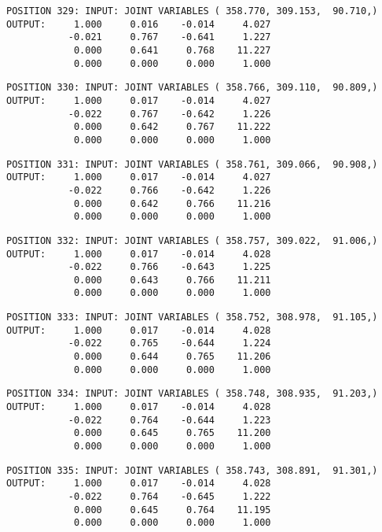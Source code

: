 \begin{verbatim}
POSITION 329: INPUT: JOINT VARIABLES ( 358.770, 309.153,  90.710,)
OUTPUT:     1.000     0.016    -0.014     4.027
           -0.021     0.767    -0.641     1.227
            0.000     0.641     0.768    11.227
            0.000     0.000     0.000     1.000
\end{verbatim} \pagebreak[1]\begin{verbatim}
POSITION 330: INPUT: JOINT VARIABLES ( 358.766, 309.110,  90.809,)
OUTPUT:     1.000     0.017    -0.014     4.027
           -0.022     0.767    -0.642     1.226
            0.000     0.642     0.767    11.222
            0.000     0.000     0.000     1.000
\end{verbatim} \pagebreak[1]\begin{verbatim}
POSITION 331: INPUT: JOINT VARIABLES ( 358.761, 309.066,  90.908,)
OUTPUT:     1.000     0.017    -0.014     4.027
           -0.022     0.766    -0.642     1.226
            0.000     0.642     0.766    11.216
            0.000     0.000     0.000     1.000
\end{verbatim} \pagebreak[1]\begin{verbatim}
POSITION 332: INPUT: JOINT VARIABLES ( 358.757, 309.022,  91.006,)
OUTPUT:     1.000     0.017    -0.014     4.028
           -0.022     0.766    -0.643     1.225
            0.000     0.643     0.766    11.211
            0.000     0.000     0.000     1.000
\end{verbatim} \pagebreak[1]\begin{verbatim}
POSITION 333: INPUT: JOINT VARIABLES ( 358.752, 308.978,  91.105,)
OUTPUT:     1.000     0.017    -0.014     4.028
           -0.022     0.765    -0.644     1.224
            0.000     0.644     0.765    11.206
            0.000     0.000     0.000     1.000
\end{verbatim} \pagebreak[1]\begin{verbatim}
POSITION 334: INPUT: JOINT VARIABLES ( 358.748, 308.935,  91.203,)
OUTPUT:     1.000     0.017    -0.014     4.028
           -0.022     0.764    -0.644     1.223
            0.000     0.645     0.765    11.200
            0.000     0.000     0.000     1.000
\end{verbatim} \pagebreak[1]\begin{verbatim}
POSITION 335: INPUT: JOINT VARIABLES ( 358.743, 308.891,  91.301,)
OUTPUT:     1.000     0.017    -0.014     4.028
           -0.022     0.764    -0.645     1.222
            0.000     0.645     0.764    11.195
            0.000     0.000     0.000     1.000
\end{verbatim} \pagebreak[1]\begin{verbatim}

\end{verbatim}
